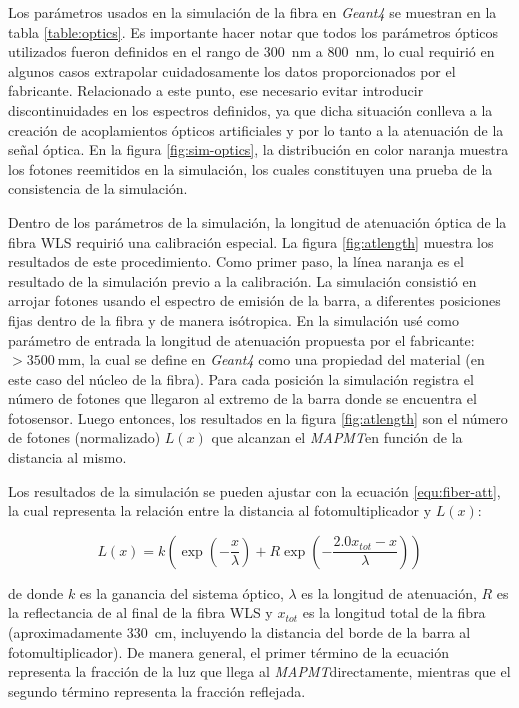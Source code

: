 Los parámetros usados en la simulación de la fibra en \emph{Geant4} se muestran en la tabla \ref{table:optics}. Es importante hacer notar que todos los parámetros ópticos utilizados fueron definidos en el rango de \SI{300}{\nano\metre} a \SI{800}{\nano\metre}, lo cual requirió en algunos casos extrapolar cuidadosamente los datos proporcionados por el fabricante. Relacionado a este punto, ese necesario evitar introducir discontinuidades en los espectros definidos, ya que dicha situación conlleva a la creación de acoplamientos ópticos artificiales y por lo tanto a la atenuación de la señal óptica. En la figura \ref{fig:sim-optics}, la distribución en color naranja muestra los fotones reemitidos en la simulación, los cuales constituyen una prueba de la consistencia de la simulación.

Dentro de los parámetros de la simulación, la longitud de atenuación óptica de la fibra WLS requirió una calibración especial. La figura \ref{fig:atlength} muestra los resultados de este procedimiento. Como primer paso, la línea naranja es el resultado de la simulación previo a la calibración. La simulación consistió en arrojar fotones usando el espectro de emisión de la barra, a diferentes posiciones fijas dentro de la fibra y de manera isótropica. En la simulación usé como parámetro de entrada la longitud de atenuación propuesta por el fabricante: $>\SI{3500}{\milli\metre}$, la cual se define en \emph{Geant4} como una propiedad del material (en este caso del núcleo de la fibra). Para cada posición la simulación registra el número de fotones que llegaron al extremo de la barra donde se encuentra el fotosensor. Luego entonces, los resultados en la figura \ref{fig:atlength} son el número de fotones (normalizado) $L(x)$ que alcanzan el \emph{MAPMT}en función de la distancia al mismo.

Los resultados de la simulación se pueden ajustar con la ecuación \ref{equ:fiber-att}, la cual representa la relación entre la distancia al fotomultiplicador y $L(x)$:

\begin{equation}
\label{equ:fiber-att}
L(x)=k\left(\exp\left(-\frac{x}{\lambda}\right) +R\exp\left(-\frac{2.0x_{tot}-x}{\lambda}\right)\right)
\end{equation}

de donde $k$ es la ganancia del sistema óptico, $\lambda$ es la longitud de atenuación, $R$ es la reflectancia de al final de la fibra WLS y $x_{tot}$ es la longitud total de la fibra (aproximadamente \SI{330}{\cm}, incluyendo la distancia del borde de la barra al fotomultiplicador). De manera general, el primer término de la ecuación representa la fracción de la luz que llega al \emph{MAPMT}directamente, mientras que el segundo término representa la fracción reflejada.

